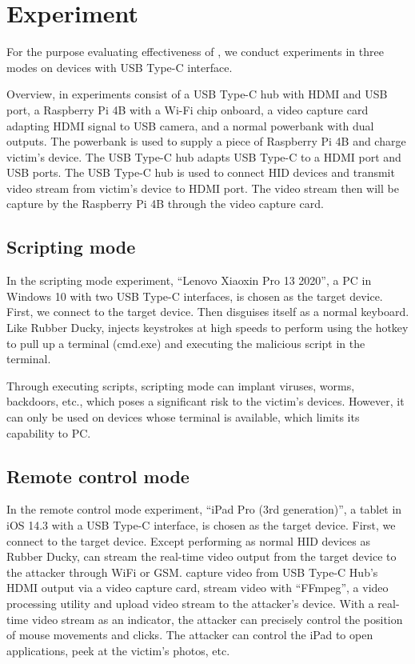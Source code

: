 \section{Experiment}
\label{sec:experiment}

For the purpose evaluating effectiveness of \tool, we conduct experiments in three modes on devices with USB Type-C interface.

Overview, \tool in experiments consist of a USB Type-C hub with HDMI and USB port,
a Raspberry Pi 4B with a Wi-Fi chip onboard,
a video capture card adapting HDMI signal to USB camera,
and a normal powerbank with dual outputs.
The powerbank is used to supply a piece of Raspberry Pi 4B and charge victim's device.
The USB Type-C hub adapts USB Type-C to a HDMI port and USB ports. The USB Type-C hub is used to connect HID devices and transmit video stream from victim's device to HDMI port. The video stream then will be capture by the Raspberry Pi 4B through the video capture card.

\subsection{Scripting mode}

In the scripting mode experiment, ``Lenovo Xiaoxin Pro 13 2020'', a PC in Windows 10 with two USB Type-C interfaces, is chosen as the target device. First, we connect \tool to the target device. Then \tool disguises itself as a normal keyboard. Like Rubber Ducky, \tool injects keystrokes at high speeds to perform using the hotkey to pull up a terminal (cmd.exe) and executing the malicious script in the terminal.

Through executing scripts, scripting mode can implant viruses, worms, backdoors, etc., which poses a significant risk to the victim's devices.
However, it can only be used on devices whose terminal is available, which limits its capability to PC.

\subsection{Remote control mode}

In the remote control mode experiment, ``iPad Pro (3rd generation)'', a tablet in iOS 14.3 with a USB Type-C interface, is chosen as the target device. First, we connect \tool to the target device.
Except performing as normal HID devices as Rubber Ducky, \tool can stream the real-time video output from the target device to the attacker through WiFi or GSM.
\tool capture video from USB Type-C Hub's HDMI output via a video capture card, stream video with ``FFmpeg'', a video processing utility and upload video stream to the attacker's device.
With a real-time video stream as an indicator, the attacker can precisely control the position of mouse movements and clicks. The attacker can control the iPad to open applications, peek at the victim's photos, etc.

